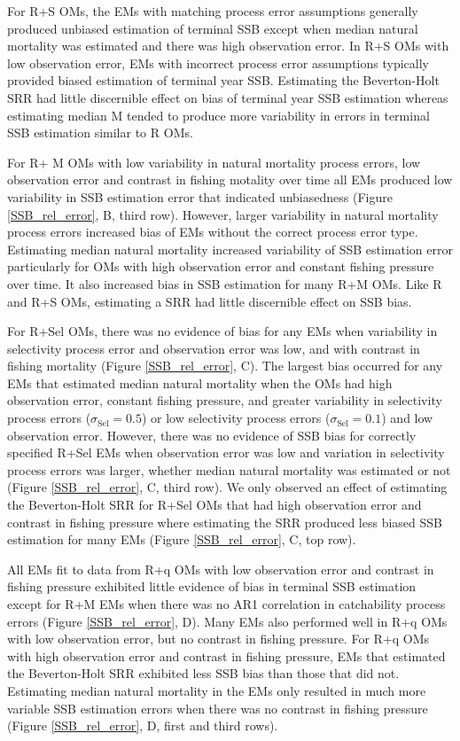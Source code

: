 \documentclass[
  12pt,
]{article}
\begin{document}
For R+S OMs, the EMs with matching process error assumptions generally
produced unbiased estimation of terminal SSB except when median natural
mortality was estimated and there was high observation error. In R+S OMs
with low observation error, EMs with incorrect process error assumptions
typically provided biased estimation of terminal year SSB. Estimating
the Beverton-Holt SRR had little discernible effect on bias of terminal
year SSB estimation whereas estimating median M tended to produce more
variability in errors in terminal SSB estimation similar to R OMs.

For R+ M OMs with low variability in natural mortality process errors,
low observation error and contrast in fishing motality over time all EMs
produced low variability in SSB estimation error that indicated
unbiasedness (Figure \ref{SSB_rel_error}, B, third row). However, larger
variability in natural mortality process errors increased bias of EMs
without the correct process error type. Estimating median natural
mortality increased variability of SSB estimation error particularly for
OMs with high observation error and constant fishing pressure over time.
It also increased bias in SSB estimation for many R+M OMs. Like R and
R+S OMs, estimating a SRR had little discernible effect on SSB bias.

For R+Sel OMs, there was no evidence of bias for any EMs when
variability in selectivity process error and observation error was low,
and with contrast in fishing mortality (Figure \ref{SSB_rel_error}, C).
The largest bias occurred for any EMs that estimated median natural
mortality when the OMs had high observation error, constant fishing
pressure, and greater variability in selectivity process errors
(\(\sigma_{\text{Sel}} = 0.5\)) or low selectivity process errors
(\(\sigma_{\text{Sel}} = 0.1\)) and low observation error. However,
there was no evidence of SSB bias for correctly specified R+Sel EMs when
observation error was low and variation in selectivity process errors
was larger, whether median natural mortality was estimated or not
(Figure \ref{SSB_rel_error}, C, third row). We only observed an effect
of estimating the Beverton-Holt SRR for R+Sel OMs that had high
observation error and contrast in fishing pressure where estimating the
SRR produced less biased SSB estimation for many EMs (Figure
\ref{SSB_rel_error}, C, top row).

All EMs fit to data from R+q OMs with low observation error and contrast
in fishing pressure exhibited little evidence of bias in terminal SSB
estimation except for R+M EMs when there was no AR1 correlation in
catchability process errors (Figure \ref{SSB_rel_error}, D). Many EMs
also performed well in R+q OMs with low observation error, but no
contrast in fishing pressure. For R+q OMs with high observation error
and contrast in fishing pressure, EMs that estimated the Beverton-Holt
SRR exhibited less SSB bias than those that did not. Estimating median
natural mortality in the EMs only resulted in much more variable SSB
estimation errors when there was no contrast in fishing pressure (Figure
\ref{SSB_rel_error}, D, first and third rows).
\end{document}
